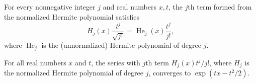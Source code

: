 \begin{lemma}
\label{BooleanAnalysis.GaussianSpace.normalizedHermite_generating_summand}
\leanok
{}
For every nonnegative integer $j$ and real numbers $x,t$, the $j$th term formed from the
normalized Hermite polynomial satisfies
\[
H_j(x)\frac{t^j}{\sqrt{j!}}=\operatorname{He}_j(x)\frac{t^j}{j!},
\]
where $\operatorname{He}_j$ is the (unnormalized) Hermite polynomial of degree $j$.
\end{lemma}

\begin{theorem}
\label{BooleanAnalysis.GaussianSpace.normalizedHermite_generating_function}
\leanok
{}
For all real numbers $x$ and $t$, the series with $j$th term $H_j(x)t^j/j!$, where $H_j$
is the normalized Hermite polynomial of degree $j$, converges to $\exp(tx-t^2/2)$.
\end{theorem}
